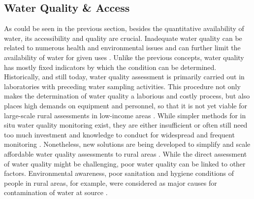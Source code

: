 \subsection{Water Quality \& Access}\label{subsec:water_quality}

As could be seen in the previous section, besides the quantitative availability of water, its accessibility and quality are crucial. Inadequate water quality can be related to numerous health and environmental issues and can further limit the availability of water for given uses \autocite{rcrcForecastbasedFinancingEarly2020, faoCopingWaterScarcity2012}. Unlike the previous concepts, water quality has mostly fixed indicators by which the condition can be determined. Historically, and still today, water quality assessment is primarily carried out in laboratories with preceding water sampling activities. This procedure not only makes the determination of water quality a laborious and costly process, but also places high demands on equipment and personnel, so that it is not yet viable for large-scale rural assessments in low-income areas \autocite{tariqOpenSourceWater2021,wmoPlanningWaterqualityMonitoring2013}. While simpler methods for in situ water quality monitoring exist, they are either insufficient or often still need too much investment and knowledge to conduct for widespread and frequent monitoring \autocite{wmoPlanningWaterqualityMonitoring2013}. Nonetheless, new solutions are being developed to simplify and scale affordable water quality assessments to rural areas \autocite{ighaloComprehensiveReviewWater2020,tariqOpenSourceWater2021}. While the direct assessment of water quality might be challenging, poor water quality can be linked to other factors. Environmental awareness, poor sanitation and hygiene conditions of people in rural areas, for example, were considered as major causes for contamination of water at source \autocite{zamxakaMicrobiologicalPhysicochemicalAssessment2004}.

